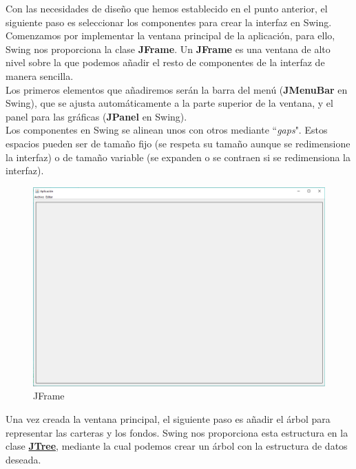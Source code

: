 \documentclass[12pt, a4paper]{book}
\begin{document}
Con las necesidades de diseño que hemos establecido en el punto anterior, el siguiente paso es seleccionar los componentes para crear la interfaz en Swing.
\\

Comenzamos por implementar la ventana principal de la aplicación, para ello, Swing nos proporciona la clase \textbf{JFrame}. Un \textbf{JFrame} es una ventana de alto nivel sobre la que podemos añadir el resto de componentes de la interfaz de manera sencilla.
\\

Los primeros elementos que añadiremos serán la barra del menú (\textbf{JMenuBar} en Swing), que se ajusta automáticamente a la parte superior de la ventana, y el panel para las gráficas (\textbf{JPanel} en Swing).
\\

Los componentes en Swing se alinean unos con otros mediante ``\textit{gaps}". Estos espacios pueden ser de tamaño fijo (se respeta su tamaño aunque se redimensione la interfaz) o de tamaño variable (se expanden o se contraen si se redimensiona la interfaz).

\begin{figure}[htbp]
	\centering
	\includegraphics[width=\textwidth]{figuras/gui1.PNG}
	\caption{JFrame}
	\label{fig:gui1}
	\end {figure}


\newpage


Una vez creada la ventana principal, el siguiente paso es añadir el árbol para representar las carteras y los fondos. Swing nos proporciona esta estructura en la clase  \href{JTree}{\textbf{JTree}}, mediante la cual podemos crear un árbol con la estructura de datos deseada.\\
\end{document}
